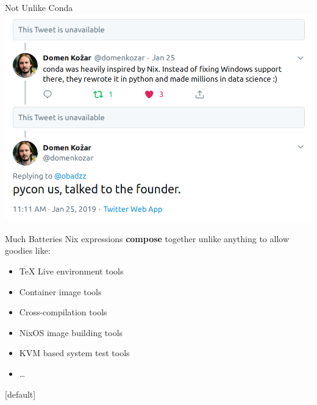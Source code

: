 \documentclass[12pt,aspectratio=169]{beamer}
\begin{document}
\begin{frame}{Not Unlike Conda}
\vspace{0.2cm}
\includegraphics[width=0.6\paperwidth]{images/nix-conda-tweet.png}
\end{frame}


\begin{frame}{Much Batteries}
  Nix expressions \textbf{compose} together unlike anything to allow goodies like:
  \begin{itemize}
    \item TeX Live environment tools
    \item Container image tools
    \item Cross-compilation tools
    \item NixOS image building tools
    \item KVM based system test tools
    \item \ldots
  \end{itemize}
\end{frame}


[default]


\end{document}
